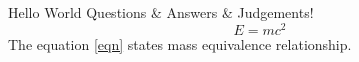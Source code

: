 \documentclass[44pt]{article}
\begin{document}
Hello World Questions \& Answers \& Judgements!
\begin{equation} \label{eqn}
    E = {mc^2}
\end{equation}
 The equation \ref{eqn} states mass equivalence relationship.




\end{document}
